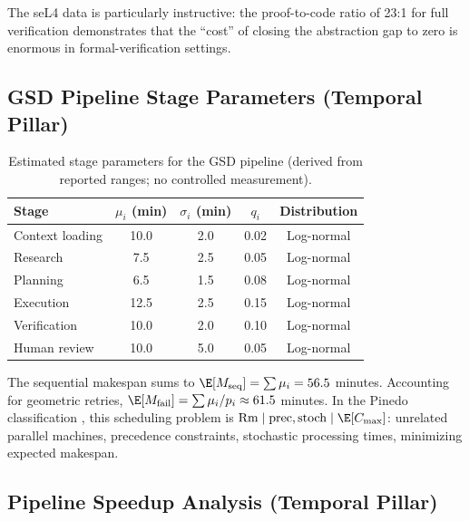 The seL4 data is particularly instructive: the proof-to-code ratio of 23:1
for full verification demonstrates that the ``cost'' of closing the abstraction
gap to zero is enormous in formal-verification settings.


\subsection{GSD Pipeline Stage Parameters (Temporal Pillar)}
\label{app:gsd-params}

\begin{table}[htbp]
\centering
\caption{Estimated stage parameters for the GSD pipeline (derived from reported ranges; no controlled measurement).}
\label{tab:ext-stages}
\begin{tabular}{lcccc}
\toprule
\textbf{Stage} & $\mu_i$ (min) & $\sigma_i$ (min) & $q_i$ & \textbf{Distribution} \\
\midrule
Context loading & 10.0 & 2.0 & 0.02 & Log-normal \\
Research & 7.5 & 2.5 & 0.05 & Log-normal \\
Planning & 6.5 & 1.5 & 0.08 & Log-normal \\
Execution & 12.5 & 2.5 & 0.15 & Log-normal \\
Verification & 10.0 & 2.0 & 0.10 & Log-normal \\
Human review & 10.0 & 5.0 & 0.05 & Log-normal \\
\bottomrule
\end{tabular}
\end{table}

The sequential makespan sums to $\E[M_{\mathrm{seq}}] = \sum \mu_i = 56.5$ minutes.
Accounting for geometric retries, $\E[M_{\mathrm{fail}}] = \sum \mu_i / p_i \approx 61.5$ minutes.
In the Pinedo classification \citep{pinedo2016scheduling}, this scheduling problem is
$\mathrm{Rm} \mid \mathrm{prec}, \mathrm{stoch} \mid \E[C_{\max}]$:
unrelated parallel machines, precedence constraints, stochastic processing times,
minimizing expected makespan.


\subsection{Pipeline Speedup Analysis (Temporal Pillar)}
\label{app:speedup}

